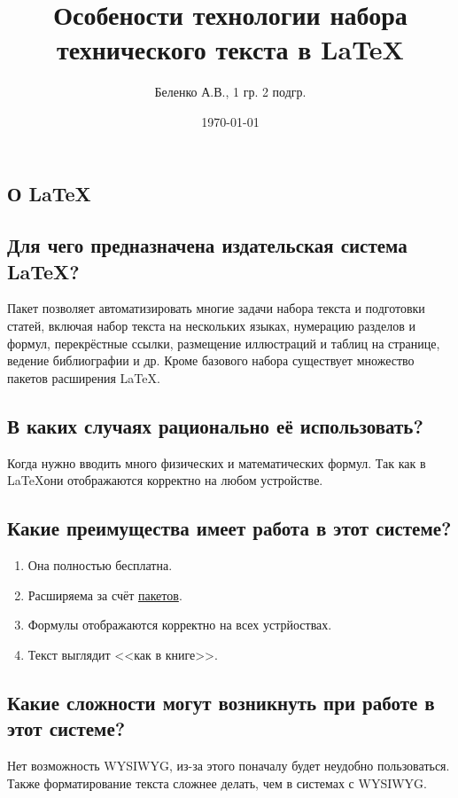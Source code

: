 \documentclass[a4paper,12pt]{article} %
\author{Беленко А.В., 1 гр. 2 подгр.}
\title{Особености технологии набора технического текста в \LaTeX{}}
\date{\today}
\begin{document}
\maketitle
\newpage
\begin{center}
\section{О \LaTeX}
\end{center}
\subsection{Для чего предназначена издательская система \LaTeX?}
Пакет позволяет автоматизировать многие задачи набора текста и подготовки статей, включая набор текста на нескольких языках, нумерацию разделов и формул, перекрёстные ссылки, размещение иллюстраций и таблиц на странице, ведение библиографии и др. Кроме базового набора существует множество пакетов расширения \LaTeX.
\subsection{В каких случаях рационально её использовать?}
\begin{flushright}
Когда нужно вводить много физических и математических формул. Так как в \LaTeX они отображаются корректно на любом устройстве.
\end{flushright}
\subsection{Какие преимущества имеет работа в этот системе?}
\begin{flushleft}
\begin{enumerate}
\item Она {\Large полностью бесплатна}.
\item Расширяема за счёт \href{https://www.ctan.org/pkg}{пакетов}.
\item Формулы отображаются корректно на всех устрйоствах.
\item Текст выглядит <<как в книге>>.
\end{enumerate}
\end{flushleft}
\subsection{Какие сложности могут возникнуть при работе в этот системе?}
Нет возможность WYSIWYG, из-за этого поначалу будет неудобно пользоваться. Также форматирование текста сложнее делать, чем в системах с WYSIWYG.
\end{document}
